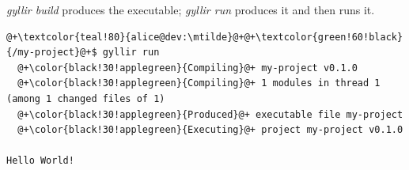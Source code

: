 \textit{gyllir build} produces the executable; \textit{gyllir run} produces it
and then runs it.

\begin{lstlisting}[style=bashVerb, escapechar=@+]
@+\textcolor{teal!80}{alice@dev:\mtilde}@+@+\textcolor{green!60!black}{/my-project}@+$ gyllir run
  @+\color{black!30!applegreen}{Compiling}@+ my-project v0.1.0
  @+\color{black!30!applegreen}{Compiling}@+ 1 modules in thread 1 (among 1 changed files of 1)
  @+\color{black!30!applegreen}{Produced}@+ executable file my-project
  @+\color{black!30!applegreen}{Executing}@+ project my-project v0.1.0

Hello World!
\end{lstlisting}

\vfill
\pagebreak
